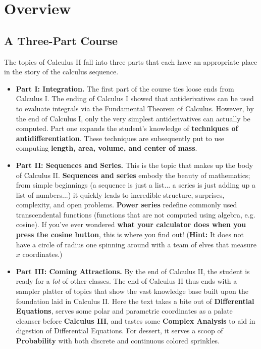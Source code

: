 \chapter{Overview }\label{Overview}

\section*{A Three-Part Course}

The topics of Calculus II fall into three parts that each have an appropriate place in the story of the calculus sequence.

\begin{itemize}
\item {\bf Part I: Integration.} The first part of the course ties loose ends from Calculus I.  The ending of Calculus I showed that antiderivatives can be used to evaluate integrals via the Fundamental Theorem of Calculus.  However, by the end of Calculus I, only the very simplest antiderivatives can actually be computed.  Part one expands the student's knowledge of {\bf techniques of antidifferentiation}.  These techniques are subsequently put to use computing {\bf length, area, volume, and center of mass}.
\item {\bf Part II: Sequences and Series.} This is the topic that makes up the body of Calculus II.   {\bf Sequences and series} embody the beauty of mathematics; from simple beginnings (a sequence is just a list... a series is just adding up a list of numbers...) it quickly leads to incredible structure, surprises, complexity, and open problems.  {\bf Power series} redefine commonly used transcendental functions (functions that are not computed using algebra, e.g. cosine).  If you've ever wondered {\bf what your calculator does when you press the cosine button}, this is where you find out!  ({\bf Hint:} It does not have a circle of radius one spinning around with a team of elves that measure $x$ coordinates.) %

\item {\bf Part III: Coming Attractions.}  By the end of Calculus II, the student is ready for a \emph{lot} of other classes.  The end of Calculus II thus ends with a sampler platter of topics that show the vast knowledge base built upon the foundation laid in Calculus II.  Here the text takes a bite out of {\bf Differential Equations}, serves some polar and parametric coordinates as a palate cleanser before {\bf Calculus III}, and tastes some {\bf Complex Analysis} to aid in digestion of Differential Equations.  For dessert, it serves a scoop of {\bf Probability} with both discrete and continuous colored sprinkles.
\end{itemize}

